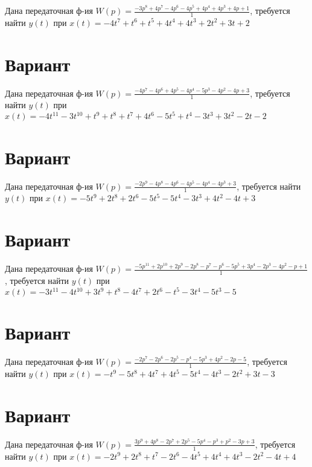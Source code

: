 \documentclass{article}
\begin{document}
Дана передаточная ф-ия $W(p)=\frac{-3p^{8}+4p^{7}-4p^{6}-4p^{5}+4p^{4}+4p^{3}+4p+1}{1}$, требуется найти $y(t)$ при $x(t)=-4t^{7}+t^{6}+t^{5}+4t^{4}+4t^{3}+2t^{2}+3t+2$



\section{Вариант}

Дана передаточная ф-ия $W(p)=\frac{-4p^{7}-4p^{6}+4p^{5}-4p^{4}-5p^{3}-4p^{2}-4p+3}{1}$, требуется найти $y(t)$ при $x(t)=-4t^{11}-3t^{10}+t^{9}+t^{8}+t^{7}+4t^{6}-5t^{5}+t^{4}-3t^{3}+3t^{2}-2t-2$



\section{Вариант}

Дана передаточная ф-ия $W(p)=\frac{-2p^{9}-4p^{8}-4p^{6}-4p^{5}-4p^{4}-4p^{3}+3}{1}$, требуется найти $y(t)$ при $x(t)=-5t^{9}+2t^{8}+2t^{6}-5t^{5}-5t^{4}-3t^{3}+4t^{2}-4t+3$



\section{Вариант}

Дана передаточная ф-ия $W(p)=\frac{-5p^{11}+2p^{10}+2p^{9}-2p^{8}-p^{7}-p^{6}-5p^{5}+3p^{4}-2p^{3}-4p^{2}-p+1}{1}$, требуется найти $y(t)$ при $x(t)=-3t^{11}-4t^{10}+3t^{9}+t^{8}-4t^{7}+2t^{6}-t^{5}-3t^{4}-5t^{3}-5$



\section{Вариант}

Дана передаточная ф-ия $W(p)=\frac{-2p^{7}-2p^{6}-2p^{5}-p^{4}-5p^{3}+4p^{2}-2p-5}{1}$, требуется найти $y(t)$ при $x(t)=-t^{9}-5t^{8}+4t^{7}+4t^{5}-5t^{4}-4t^{3}-2t^{2}+3t-3$



\section{Вариант}

Дана передаточная ф-ия $W(p)=\frac{3p^{9}+4p^{8}-2p^{7}+2p^{5}-5p^{4}-p^{3}+p^{2}-3p+3}{1}$, требуется найти $y(t)$ при $x(t)=-2t^{9}+2t^{8}+t^{7}-2t^{6}-4t^{5}+4t^{4}+4t^{3}-2t^{2}-4t+4$
\end{document}
